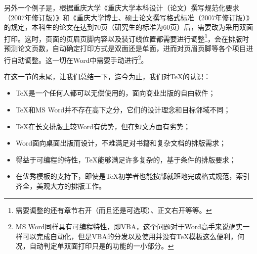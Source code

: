 另外一个例子是，根据重庆大学《重庆大学本科设计（论文）撰写规范化要求（2007年修订版）》和《重庆大学博士、硕士论文撰写格式标准（2007年修订版）》的规定，本科生的论文在达到70页（研究生的标准为60页）后，需要改为采用双面打印。这时，页面的页眉页脚内容以及装订线位置都需要进行调整\footnote{需要调整的还有章节右开（而且还是可选项）、正文右开等等。}，\cquthesis 会在排版时预测论文页数，自动确定打印方式是双面还是单面，进而对页眉页脚等各个项目进行自动调整。这一切在Word中需要手动进行\footnote{MS Word同样具有可编程特性，即VBA，这个问题对于Word高手来说确实一样可以完成自动化，但是VBA的分发以及使用并没有\TeX 模板这么便利，何况，自动判定单双面打印只是\cquthesis 的功能的一小部分。}。

在这一节的末尾，让我们总结一下，迄今为止，我们对\TeX 的认识：
\begin{itemize}
	\item \TeX 是一个任何人都可以无偿使用的，面向商业出版的自由软件；
	\item \TeX 和MS Word并不存在高下之分，它们的设计理念和目标邻域不同；
	\item \TeX 在长文排版上较Word有优势，但在短文方面有劣势；
	\item Word面向桌面出版而设计，不难满足对书籍和复杂文档的排版需求；
	\item 得益于可编程的特性，\TeX 能够满足许多复杂的，基于条件的排版要求；
	\item 在优秀模板的支持下，即使是\TeX 初学者也能按部就班地完成格式规范，索引齐全，美观大方的排版工作。
\end{itemize}